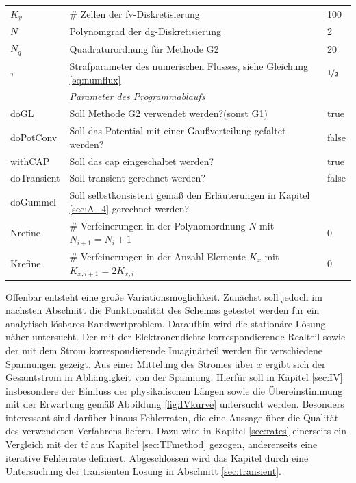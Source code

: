\begin{table}
\begin{tabular}{
    l
    l
    l
  }
    $K_y$ & \# Zellen der \ac{fv}-Diskretisierung & 100 \\
    $N$ & Polynomgrad der \ac{dg}-Diskretisierung & 2 \\
    $N_q$ & Quadraturordnung für Methode G2 & 20 \\
    $\tau$ & Strafparameter des numerischen Flusses, siehe Gleichung \eqref{eq:numflux} &$\nicefrac{1}{2}$ \\
    \midrule
     & \emph{Parameter des Programmablaufs} & \\
    doGL & Soll Methode G2 verwendet werden?(sonst G1) & true \\
    doPotConv & Soll das Potential mit einer Gaußverteilung gefaltet werden? & false\\
    withCAP & Soll das \ac{cap} eingeschaltet werden? & true \\
    doTransient & Soll transient gerechnet werden? & false \\
    doGummel & Soll selbstkonsistent gemäß den Erläuterungen in Kapitel \ref{sec:A_4} gerechnet werden? \\
    Nrefine  & \# Verfeinerungen in der Polynomordnung $N$ mit $N_{i+1}=N_i+1$ & 0 \\
    Krefine  & \# Verfeinerungen in der Anzahl Elemente $K_x$ mit $K_{x,i+1}=2K_{x,i}$ & 0 \\
    \bottomrule
  \end{tabular}
\end{table}
Offenbar entsteht eine große Variationsmöglichkeit. Zunächst soll jedoch im nächsten Abschnitt die Funktionalität des Schemas getestet werden für ein analytisch lösbares Randwertproblem. Daraufhin wird die stationäre Lösung näher untersucht. Der mit der Elektronendichte korrespondierende Realteil sowie der mit dem Strom korrespondierende Imaginärteil werden für verschiedene Spannungen gezeigt. Aus einer Mittelung des Stromes über $x$ ergibt sich der Gesamtstrom in Abhängigkeit von der Spannung. Hierfür soll in Kapitel \ref{sec:IV} insbesondere der Einfluss der physikalischen Längen sowie die Übereinstimmung mit der Erwartung gemäß Abbildung \ref{fig:IVkurve} untersucht werden. Besonders interessant sind darüber hinaus Fehlerraten, die eine Aussage über die Qualität des verwendeten Verfahrens liefern. Dazu wird in Kapitel \ref{sec:rates} einerseits ein Vergleich mit der \ac{tf} aus Kapitel \ref{sec:TFmethod} gezogen, andererseits eine iterative Fehlerrate definiert. Abgeschlossen wird das Kapitel durch eine Untersuchung der transienten Lösung in Abschnitt \ref{sec:transient}.

